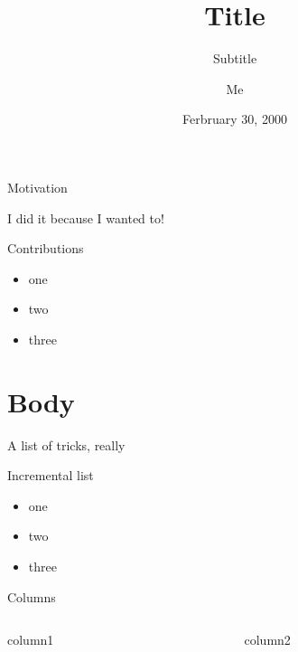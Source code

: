 \documentclass[12pt,ignorenonframetext,aspectratio=169]{beamer}
\title{Title}
\subtitle{Subtitle}
\author{Me}
\institute{Affiliation \and Something else}
\date{Ferbruary 30, 2000}
\providecommand{\tightlist}{%
  \setlength{\itemsep}{0pt}\setlength{\parskip}{0pt}}
\begin{document}
\frame{\titlepage}

\begin{frame}{Motivation}
\protect\hypertarget{motivation}{}

I did it because I wanted to!

\end{frame}

\begin{frame}{Contributions}
\protect\hypertarget{contributions}{}

\begin{itemize}
\tightlist
\item
  one
\item
  two
\item
  three
\end{itemize}

\end{frame}

\hypertarget{body}{%
\section{Body}\label{body}}

\begin{frame}{A list of tricks, really}
\protect\hypertarget{a-list-of-tricks-really}{}

\end{frame}

\begin{frame}{Incremental list}
\protect\hypertarget{incremental-list}{}

\begin{itemize}[<+->]
\tightlist
\item
  one
\item
  two
\item
  three
\end{itemize}

\end{frame}

\begin{frame}{Columns}
\protect\hypertarget{columns}{}

\begin{columns}[T]
\begin{column}{0.48\textwidth}
column1
\end{column}

\begin{column}{0.48\textwidth}
column2
\end{column}
\end{columns}

\end{frame}
\end{document}
